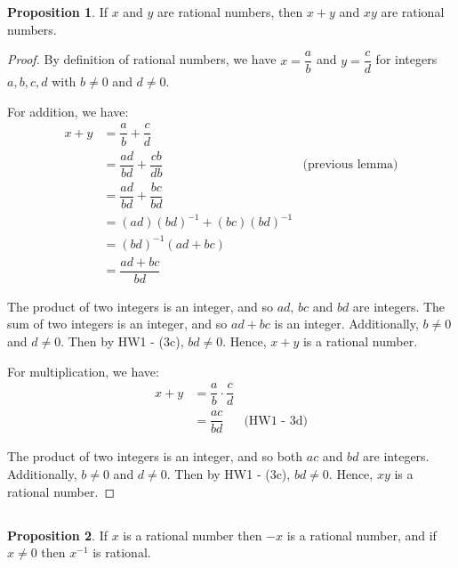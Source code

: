 \documentclass[12pt, letterpaper]{article}
\theoremstyle{definition} %
\newtheorem*{prop}{Proposition}
\begin{document}
\begin{prop}
    If $x$ and $y$ are rational numbers, then $x+y$ and $xy$ are rational 
    numbers.
    \begin{proof}
        By definition of rational numbers, we have $x = \dfrac{a}{b}$
        and $y = \dfrac{c}{d}$ for integers $a,b,c,d$ with $b \neq 0$ and 
        $d \neq 0$. 

        For addition, we have:
        \begin{align*}
            x+y &= \dfrac{a}{b} + \dfrac{c}{d} \\
                &= \dfrac{ad}{bd} + \dfrac{cb}{db}  &\text{(previous lemma)} \\
                &= \dfrac{ad}{bd} + \dfrac{bc}{bd} \\ 
                &= (ad)(bd)^{-1} + (bc)(bd)^{-1}   \\
                &= (bd)^{-1} (ad + bc)  \\
                &= \dfrac{ad+bc}{bd}
        \end{align*}

        The product of two integers is an integer, and so $ad$, $bc$ and $bd$ are
        integers. The sum of two integers is an integer, and so $ad+bc$ is an 
        integer. Additionally, $b\neq 0$ and $d\neq 0$. Then by HW1 - (3c), 
        $bd \neq 0$. Hence, $x+y$ is a rational number.

        For multiplication, we have:
        \begin{align*}
            x+y &= \dfrac{a}{b} \cdot \dfrac{c}{d} \\
                &= \dfrac{ac}{bd}   &\text{(HW1 - 3d)}
        \end{align*}

        The product of two integers is an integer, and so both $ac$ and $bd$ are
        integers. Additionally, $b\neq 0$ and $d\neq 0$. Then by HW1 - (3c), 
        $bd \neq 0$. Hence, $xy$ is a rational number.
    \end{proof}

\end{prop}
\subsection{}
\begin{prop}
    If $x$ is a rational number then $-x$ is a rational number, and if
    $x \neq 0$ then $x^{-1}$ is rational.
    \
\end{prop}
\end{document}
